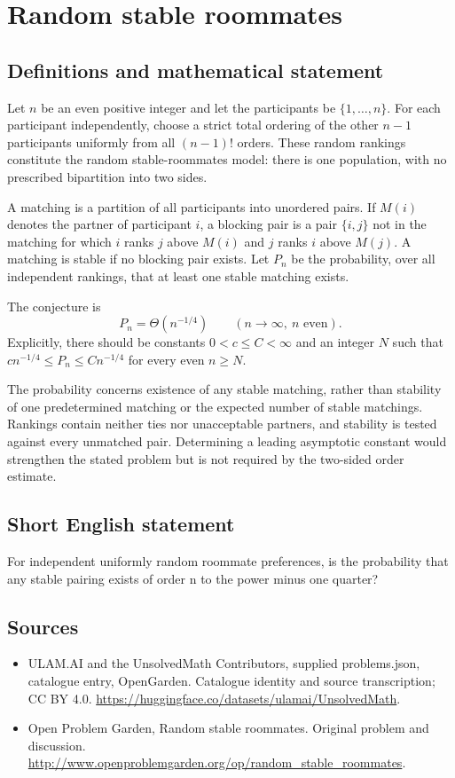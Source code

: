 \documentclass[11pt,a4paper]{article}
\begin{document}
\section*{Random stable roommates}\label{statement}

\subsection{Definitions and mathematical statement}
Let $n$ be an even positive integer and let the participants be $\{1,\ldots,n\}$. For each participant independently, choose a strict total ordering of the other $n-1$ participants uniformly from all $(n-1)!$ orders. These random rankings constitute the random stable-roommates model: there is one population, with no prescribed bipartition into two sides.

A matching is a partition of all participants into unordered pairs. If $M(i)$ denotes the partner of participant $i$, a blocking pair is a pair $\{i,j\}$ not in the matching for which $i$ ranks $j$ above $M(i)$ and $j$ ranks $i$ above $M(j)$. A matching is stable if no blocking pair exists. Let $P_n$ be the probability, over all independent rankings, that at least one stable matching exists.

The conjecture is
\[
                         P_n=\Theta(n^{-1/4})
       \qquad(n\longrightarrow\infty,\ n\text{ even}).
\]
Explicitly, there should be constants $0<c\le C<\infty$ and an integer $N$ such that $c n^{-1/4}\le P_n\le C n^{-1/4}$ for every even $n\ge N$.

The probability concerns existence of any stable matching, rather than stability of one predetermined matching or the expected number of stable matchings. Rankings contain neither ties nor unacceptable partners, and stability is tested against every unmatched pair. Determining a leading asymptotic constant would strengthen the stated problem but is not required by the two-sided order estimate.
\subsection{Short English statement}
For independent uniformly random roommate preferences, is the probability that any stable pairing exists of order n to the power minus one quarter?
\subsection{Sources}
\begin{itemize}
\item[S1] ULAM.AI and the UnsolvedMath Contributors, supplied problems.json, catalogue entry, OpenGarden. Catalogue identity and source transcription; CC BY 4.0.
\url{https://huggingface.co/datasets/ulamai/UnsolvedMath}.
\item[S2] Open Problem Garden, Random stable roommates. Original problem and discussion.
\url{http://www.openproblemgarden.org/op/random_stable_roommates}.
\end{itemize}
\end{document}
